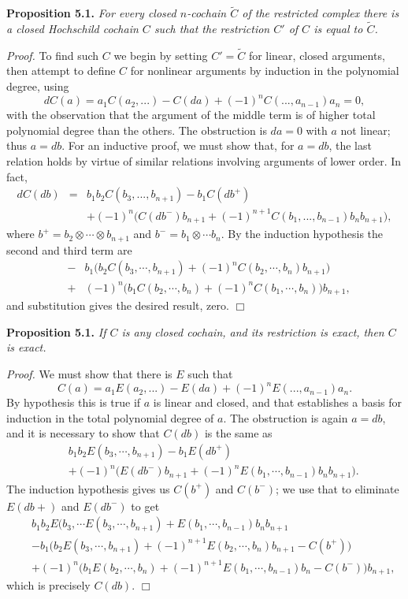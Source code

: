\documentclass[a4paper,a4paper]{article}
\begin{document}
\noindent\textbf{Proposition 5.1.} \textit{
For every closed $n$-cochain $\tilde C$ of the restricted complex there 
is a closed Hochschild cochain $C$ such that the restriction $C'$ of $C$ 
is equal to $\tilde C$.}

\noindent\textit{Proof.}
To find such $C$ we begin by setting $C' = \tilde C$ for
linear, closed arguments, then attempt to define $C$ for nonlinear
arguments by induction in the polynomial degree, using
$$
dC(a)  = a_1C(a_2,...) - C(da) + (-1)^nC(...,a_{n-1})a_n=0,
$$
with the observation that the argument of the middle term is of higher
total polynomial degree  than the others.  The obstruction is $da = 0$ 
with $a$ not linear; thus $a = db$.  For an inductive proof, we must
show that, for $a=db$, the last relation holds by virtue of similar 
relations involving arguments of lower order.  In fact,
\begin{eqnarray*}
dC(db) &=& b_1b_2C(b_3,..., b_{n+1}) - b_1C(db^+)\\
&& +(-1)^n\bigl(C(db^-)b_{n+1}+ (-1)^{n+1}C(b_1,...,b_{n-1})b_nb_{n+1}\bigr),
\end{eqnarray*}
where $b^+ = b_2\otimes \cdots \otimes b_{n+1}$ and 
$b^- = b_1\otimes \cdots b_{n}$. By the induction hypothesis the second
and third term are
\begin{eqnarray*}
&-&b_1\biggl(b_2C(b_3,\cdots,b_{n+1})
+(-1)^nC(b_2,\cdots,b_n)b_{n+1}\biggr)\\
&+&(-1)^n\biggl(b_1C(b_2,\cdots,b_n) +
(-1)^nC(b_1,\cdots,b_n)\biggr)b_{n+1},
\end{eqnarray*}
and substitution gives the desired result, zero. \hfill $\Box$
\medskip

\noindent\textbf{Proposition 5.1.} \textit{
If $C$ is any closed cochain, and its restriction is exact, then $C$ is exact.}

\noindent\textit{Proof.} We must show that there is $E$ such that
$$
C(a) = a_1E(a_2,...) - E(da) + (-1)^nE(...,a_{n-1})a_n.
$$
By hypothesis this is true if $a$ is linear and closed, and that establishes
a basis for induction in the total polynomial degree of $a$. The
obstruction is again $a = db$, and  it is necessary to show that $C(db)$ is
the same as
\begin{eqnarray*}
&&b_1b_2E(b_3,\cdots ,b_{n+1}) - b_1E(db^+)\\
&&+(-1)^n\biggl(E(db^-)b_{n+1} +
(-1)^nE(b_1,\cdots,b_{n-1})b_nb_{n+1}\biggr).
\end{eqnarray*}
The induction hypothesis gives us $C(b^+)$ and $C(b^-)$; we use that
to eliminate $E(db+)$ and $E(db^-)$ to get
\begin{eqnarray*}
&&b_1b_2E(b_3,\cdots E(b_3,\cdots ,b_{n+1})  +
 E(b_1,\cdots,b_{n-1})b_nb_{n+1}\\
&&-b_1\biggl(b_2E(b_3,\cdots,b_{n+1}) +
(-1)^{n+1}E(b_2,\cdots,b_n)b_{n+1} - C(b^+)\biggr)\\
&&+(-1)^n\biggl(b_1E(b_2,\cdots ,b_n) +
(-1)^{n+1}E(b_1,\cdots,b_{n-1})b_n - C(b^-)\biggr)b_{n+1},
\end{eqnarray*}
which is precisely $C(db)$. \hfill $\Box$
\smallskip
\end{document}
